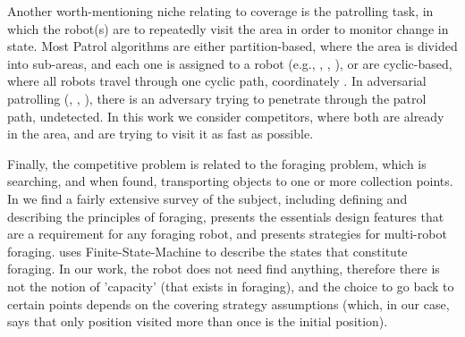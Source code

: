 Another worth-mentioning niche relating to coverage is the patrolling task, in which the robot(s) are to repeatedly visit the area in order to monitor change in state. Most Patrol algorithms are either partition-based, where the area is divided into sub-areas, and each one is assigned to a robot (e.g., \cite{guo2004towards}, \cite{guo2004coverage}, \cite{jung2002tracking}), or are cyclic-based, where all robots travel through one cyclic path, coordinately \cite{chevaleyre2004theoretical}. 
In adversarial patrolling (\cite{agmon2011multi}, \cite{sless2014multi}, \cite{agmon2008multi}), there is an adversary trying to penetrate through the patrol path, undetected. In this work we consider competitors, where both are already in the area, and are trying to visit it as fast as possible. %

Finally, the competitive problem is related to the foraging problem, which is searching, and when found, transporting objects to one or more collection points. In \cite{winfield2009foraging} we find a fairly extensive survey of the subject, including defining and describing the principles of foraging, presents the essentials design features that are a requirement for any foraging robot, and presents strategies for multi-robot foraging. \cite{winfield2009foraging} uses Finite-State-Machine to describe the states that constitute foraging. In our work, the robot does not need find anything, therefore there is not the notion of 'capacity' (that exists in foraging), and the choice to go back to certain points depends on the covering strategy assumptions (which, in our case, says that only position visited more than once is the initial position).